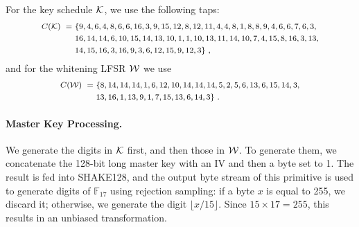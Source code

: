   For the key schedule $\mathcal{K}$, we use the following taps:
  \begin{equation*}
    \footnotesize
    \begin{split}
      C(\mathcal{K}) ~=~& \{9, 4, 6, 4, 8, 6, 6, 16, 3,
                        9, 15, 12, 8, 12, 11, 4, 4, 8, 1,
                        8, 8, 9, 4, 6, 6, 7, 6, 3, \\
                      & 16, 14, 14, 6, 10, 15, 14, 13, 10, 1, 1,
                        10, 13, 11, 14, 10, 7, 4, 15, 8, 16,
                        3, 13, \\
                      & 14, 15, 16, 3, 16, 9, 3, 6,
                        12, 15, 9, 12, 3\}~,
    \end{split}
  \end{equation*}
  and for the whitening LFSR $\mathcal{W}$ we use
  \begin{equation*}
    \footnotesize
    \begin{split}
      C(\mathcal{W}) ~=~& \{8, 14, 14, 14, 1, 6, 12, 10, 14, 14,
                         14, 5, 2, 5, 6, 13, 6, 15, 14, 3, \\
                       & 13, 16, 1, 13, 9, 1, 7, 15, 13, 6,
                         14, 3\}~.
    \end{split}
  \end{equation*}


\paragraph{Master Key Processing.}
We generate the digits in $\mathcal{K}$ first, and then those in $\mathcal{W}$. To generate them, we concatenate the 128-bit long master key with an IV and then a byte set to 1. The result is fed into \textsf{SHAKE128}, and the output byte stream of this primitive is used to generate digits of $\mathbb{F}_{17}$ using rejection sampling: if a byte $x$ is equal to 255, we discard it; otherwise, we generate the digit $\lfloor x / 15 \rfloor$. Since $15 \times 17 = 255$, this results in an unbiased transformation.
